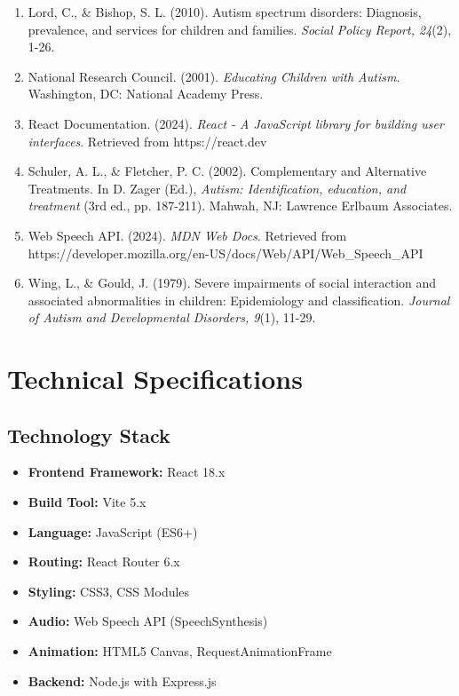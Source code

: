 \documentclass[12pt,a4paper]{article}
\begin{document}
\begin{itemize}
\begin{enumerate}[leftmargin=*]
    \item Lord, C., \& Bishop, S. L. (2010). Autism spectrum disorders: Diagnosis, prevalence, and services for children and families. \textit{Social Policy Report, 24}(2), 1-26.
    
    \item National Research Council. (2001). \textit{Educating Children with Autism}. Washington, DC: National Academy Press.
    
    \item React Documentation. (2024). \textit{React - A JavaScript library for building user interfaces}. Retrieved from https://react.dev
    
    \item Schuler, A. L., \& Fletcher, P. C. (2002). Complementary and Alternative Treatments. In D. Zager (Ed.), \textit{Autism: Identification, education, and treatment} (3rd ed., pp. 187-211). Mahwah, NJ: Lawrence Erlbaum Associates.
    
    \item Web Speech API. (2024). \textit{MDN Web Docs}. Retrieved from https://developer.mozilla.org/en-US/docs/Web/API/Web\_Speech\_API
    
    \item Wing, L., \& Gould, J. (1979). Severe impairments of social interaction and associated abnormalities in children: Epidemiology and classification. \textit{Journal of Autism and Developmental Disorders, 9}(1), 11-29.
\end{enumerate}

\newpage
\appendix
\section{Technical Specifications}

\subsection{Technology Stack}
\begin{itemize}
    \item \textbf{Frontend Framework:} React 18.x
    \item \textbf{Build Tool:} Vite 5.x
    \item \textbf{Language:} JavaScript (ES6+)
    \item \textbf{Routing:} React Router 6.x
    \item \textbf{Styling:} CSS3, CSS Modules
    \item \textbf{Audio:} Web Speech API (SpeechSynthesis)
    \item \textbf{Animation:} HTML5 Canvas, RequestAnimationFrame
    \item \textbf{Backend:} Node.js with Express.js
\end{itemize}


\end{itemize}
\end{document}
